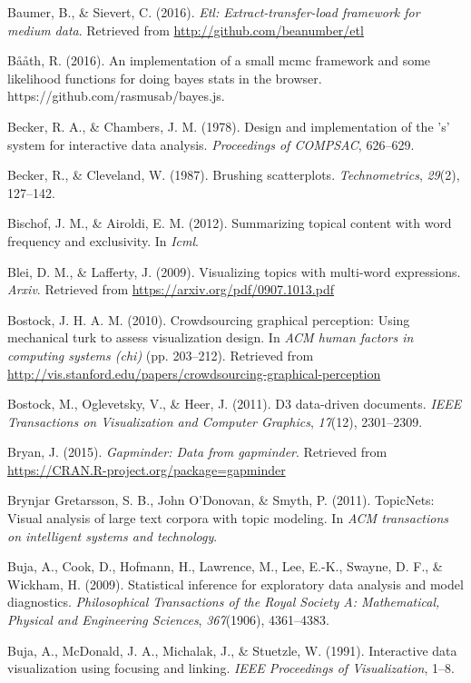 \documentclass[12pt,]{isuthesis}
\begin{document}
\hypertarget{ref-etl}{} 
Baumer, B., \& Sievert, C. (2016). \emph{Etl: Extract-transfer-load framework for medium data}. Retrieved from \url{http://github.com/beanumber/etl}

\hypertarget{ref-bayes-js}{}
Bååth, R. (2016). An implementation of a small mcmc framework and some
likelihood functions for doing bayes stats in the browser.
https://github.com/rasmusab/bayes.js.

\hypertarget{ref-S:1978}{}
Becker, R. A., \& Chambers, J. M. (1978). Design and implementation of
the 's' system for interactive data analysis. \emph{Proceedings of
COMPSAC}, 626--629.

\hypertarget{ref-brushing-scatterplots}{}
Becker, R., \& Cleveland, W. (1987). Brushing scatterplots.
\emph{Technometrics}, \emph{29}(2), 127--142.

\hypertarget{ref-Bischof}{}
Bischof, J. M., \& Airoldi, E. M. (2012). Summarizing topical content
with word frequency and exclusivity. In \emph{Icml}.

\hypertarget{ref-Blei-2009}{}
Blei, D. M., \& Lafferty, J. (2009). Visualizing topics with multi-word
expressions. \emph{Arxiv}. Retrieved from
\url{https://arxiv.org/pdf/0907.1013.pdf}

\hypertarget{ref-crowdsourcing-graphical-perception}{}
Bostock, J. H. A. M. (2010). Crowdsourcing graphical perception: Using
mechanical turk to assess visualization design. In \emph{ACM human
factors in computing systems (chi)} (pp. 203--212). Retrieved from
\url{http://vis.stanford.edu/papers/crowdsourcing-graphical-perception}

\hypertarget{ref-d3}{}
Bostock, M., Oglevetsky, V., \& Heer, J. (2011). D3 data-driven
documents. \emph{IEEE Transactions on Visualization and Computer
Graphics}, \emph{17}(12), 2301--2309.

\hypertarget{ref-gapminder}{}
Bryan, J. (2015). \emph{Gapminder: Data from gapminder}. Retrieved from
\url{https://CRAN.R-project.org/package=gapminder}

\hypertarget{ref-Gretarsson}{}
Brynjar Gretarsson, S. B., John O'Donovan, \& Smyth, P. (2011).
TopicNets: Visual analysis of large text corpora with topic modeling. In
\emph{ACM transactions on intelligent systems and technology}.

\hypertarget{ref-Buja:2009hp}{}
Buja, A., Cook, D., Hofmann, H., Lawrence, M., Lee, E.-K., Swayne, D.
F., \& Wickham, H. (2009). Statistical inference for exploratory data
analysis and model diagnostics. \emph{Philosophical Transactions of the
Royal Society A: Mathematical, Physical and Engineering Sciences},
\emph{367}(1906), 4361--4383.

\hypertarget{ref-Buja:1991vh}{}
Buja, A., McDonald, J. A., Michalak, J., \& Stuetzle, W. (1991).
Interactive data visualization using focusing and linking. \emph{IEEE
Proceedings of Visualization}, 1--8.
\end{document}
